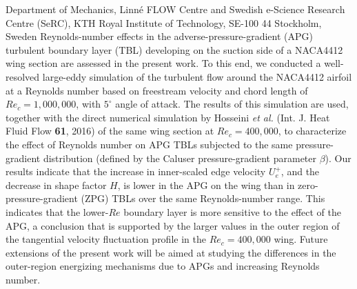 %
%
%
%
%
%
%
\paperaffiliation
{%
Department of Mechanics, Linn\'e FLOW Centre and Swedish e-Science Research Centre (SeRC), KTH Royal Institute of Technology, SE-100 44 Stockholm, Sweden 
}%
%
%
%
\papervolume{}%
%
%
\paperpages{}%
%
\paperyear{}%
%
\papersummary%
{%
	Reynolds-number effects in the adverse-pressure-gradient (APG) turbulent boundary layer (TBL) developing on the suction side of a NACA4412 wing section are assessed in the present work. To this end, we conducted a well-resolved large-eddy simulation of the turbulent flow around the NACA4412 airfoil at a Reynolds number based on freestream velocity and chord length of $Re_{c}=1,000,000$, with $5^{\circ}$ angle of attack. The results of this simulation are used, together with the direct numerical simulation by Hosseini {\it et al.} (Int. J. Heat Fluid Flow {\bf 61}, 2016) of the same wing section at $Re_{c}=400,000$, to characterize the effect of Reynolds number on APG TBLs subjected to the same pressure-gradient distribution (defined by the Caluser pressure-gradient parameter $\beta$). Our results indicate that the increase in inner-scaled edge velocity $U^{+}_{e}$, and the decrease in shape factor $H$, is lower in the APG on the wing than in zero-pressure-gradient (ZPG) TBLs over the same Reynolds-number range. This indicates that the lower-$Re$ boundary layer is more sensitive to the effect of the APG, a conclusion that is supported by the larger values in the outer region of the tangential velocity fluctuation profile in the $Re_{c}=400,000$ wing. Future extensions of the present work will be aimed at studying the differences in the outer-region energizing mechanisms due to APGs and increasing Reynolds number.
}%
